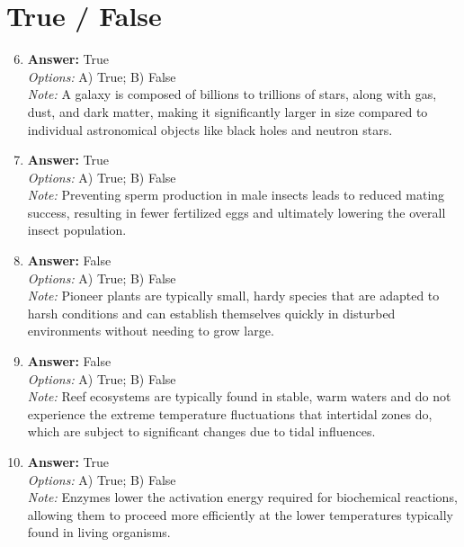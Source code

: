 \documentclass[12pt]{article}
\begin{document}
\section*{True / False}
\begin{enumerate}[label=\arabic*.]
\setcounter{enumi}{5}
\item \textbf{Answer:} True
\\ \textit{Options:} A) True; B) False
\\ \textit{Note:} A galaxy is composed of billions to trillions of stars, along with gas, dust, and dark matter, making it significantly larger in size compared to individual astronomical objects like black holes and neutron stars.
\item \textbf{Answer:} True
\\ \textit{Options:} A) True; B) False
\\ \textit{Note:} Preventing sperm production in male insects leads to reduced mating success, resulting in fewer fertilized eggs and ultimately lowering the overall insect population.
\item \textbf{Answer:} False
\\ \textit{Options:} A) True; B) False
\\ \textit{Note:} Pioneer plants are typically small, hardy species that are adapted to harsh conditions and can establish themselves quickly in disturbed environments without needing to grow large.
\item \textbf{Answer:} False
\\ \textit{Options:} A) True; B) False
\\ \textit{Note:} Reef ecosystems are typically found in stable, warm waters and do not experience the extreme temperature fluctuations that intertidal zones do, which are subject to significant changes due to tidal influences.
\item \textbf{Answer:} True
\\ \textit{Options:} A) True; B) False
\\ \textit{Note:} Enzymes lower the activation energy required for biochemical reactions, allowing them to proceed more efficiently at the lower temperatures typically found in living organisms.
\end{enumerate}
\end{document}
